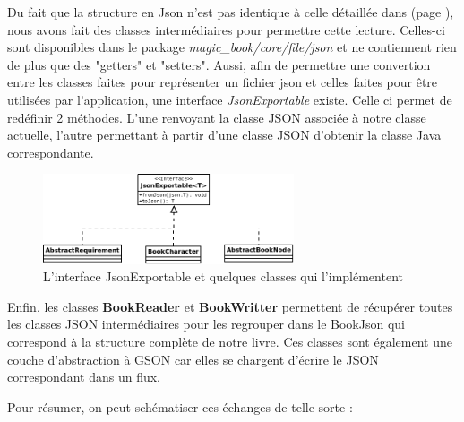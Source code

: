 			Du fait que la structure en Json n'est pas identique à celle détaillée dans  (page \pageref{sec:representation_livre}), nous avons fait des classes intermédiaires pour permettre cette lecture. Celles-ci sont disponibles dans le package \textit{magic\_book/core/file/json} et ne contiennent rien de plus que des "getters" et "setters". Aussi, afin de permettre une convertion entre les classes faites pour représenter un fichier json et celles faites pour être utilisées par l'application, une interface \textit{JsonExportable} existe. Celle ci permet de redéfinir 2 méthodes. L'une renvoyant la classe JSON associée à notre classe actuelle, l'autre permettant à partir d'une classe JSON d'obtenir la classe Java correspondante.

			\begin{figure}[H]
				\centering\includegraphics[width=0.66\textwidth, keepaspectratio]{img/json_exportable.png}
				\caption{L'interface JsonExportable et quelques classes qui l'implémentent}
			\end{figure}

			Enfin, les classes \textbf{BookReader} et \textbf{BookWritter} permettent de récupérer toutes les classes JSON intermédiaires pour les regrouper dans le BookJson qui correspond à la structure complète de notre livre. Ces classes sont également une couche d'abstraction à GSON car elles se chargent d'écrire le JSON correspondant dans un flux.

			Pour résumer, on peut schématiser ces échanges de telle sorte :

